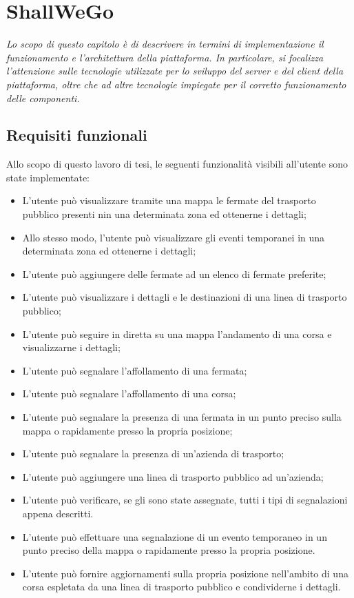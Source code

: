\chapter{ShallWeGo}
\newenvironment{code}{\captionsetup{type=listing}}{}

\begin{citazione}
    \textit{Lo scopo di questo capitolo è di descrivere in termini di implementazione il funzionamento e l'architettura della piattaforma. In particolare, si focalizza l'attenzione sulle tecnologie utilizzate per lo sviluppo del server e del client della piattaforma, oltre che ad altre tecnologie impiegate per il corretto funzionamento delle componenti.}
\end{citazione}

\newpage

\section{Requisiti funzionali}
    Allo scopo di questo lavoro di tesi, le seguenti funzionalità visibili all'utente sono state implementate:

    \begin{itemize}
        \item L'utente può visualizzare tramite una mappa le fermate del trasporto pubblico presenti nin una determinata zona ed ottenerne i dettagli;
        \item Allo stesso modo, l'utente può visualizzare gli eventi temporanei in una determinata zona ed ottenerne i dettagli;
        \item L'utente può aggiungere delle fermate ad un elenco di fermate preferite;
        \item L'utente può visualizzare i dettagli e le destinazioni di una linea di trasporto pubblico;
        \item L'utente può seguire in diretta su una mappa l'andamento di una corsa e visualizzarne i dettagli;
        \item L'utente può segnalare l'affollamento di una fermata;
        \item L'utente può segnalare l'affollamento di una corsa;
        \item L'utente può segnalare la presenza di una fermata in un punto preciso sulla mappa o rapidamente presso la propria posizione;
        \item L'utente può segnalare la presenza di un'azienda di trasporto;
        \item L'utente può aggiungere una linea di trasporto pubblico ad un'azienda;
        \item L'utente può verificare, se gli sono state assegnate, tutti i tipi di segnalazioni appena descritti.
        \item L'utente può effettuare una segnalazione di un evento temporaneo in un punto preciso della mappa o rapidamente presso la propria posizione.
        \item L'utente può fornire aggiornamenti sulla propria posizione nell'ambito di una corsa espletata da una linea di trasporto pubblico e condividerne i dettagli.
    \end{itemize}

